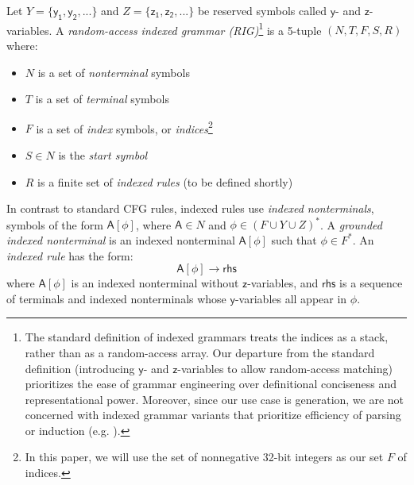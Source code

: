 \documentclass[11pt]{article}
\renewcommand{\bnfpn}[1]{\mathsf{#1}}
\renewcommand{\bnfpo}{\rightarrow}
\begin{document}
Let $Y = \{\bnfpn{y_1}, \bnfpn{y_2}, ...\}$ and $Z = \{\bnfpn{z_1}, \bnfpn{z_2}, ...\}$ be reserved symbols called $\bnfpn{y}$- and $\bnfpn{z}$-variables. A \emph{random-access indexed grammar (RIG)}\footnote{The standard definition of indexed grammars \cite{hopcroft2001introduction} treats the indices as a stack, rather than as a random-access array. Our departure from the standard definition (introducing $\bnfpn{y}$- and $\bnfpn{z}$-variables to allow random-access matching) prioritizes the ease of grammar engineering over definitional conciseness and representational power. Moreover, since our use case is generation, we are not concerned with indexed grammar variants that prioritize efficiency of parsing or induction (e.g. \cite{gazdar-1987-comit}).} is a 5-tuple $(N, T, F, S, R)$ where:
\begin{itemize}
	\item $N$ is a set of \emph{nonterminal} symbols
	\item $T$ is a set of \emph{terminal} symbols
	\item $F$ is a set of \emph{index} symbols, or \emph{indices}\footnote{In this paper, we will use the set of nonnegative 32-bit integers as our set $F$ of indices.}
	\item $S \in N$ is the \emph{start symbol}
	\item $R$ is a finite set of \emph{indexed rules} (to be defined shortly)
\end{itemize}
In contrast to standard CFG rules, indexed rules use \emph{indexed nonterminals}, symbols of the form $\bnfpn{A[\phi]}$, where $\bnfpn{A} \in N$ and $\bnfpn{\phi} \in (F \cup Y \cup Z)^*$. A \emph{grounded indexed nonterminal} is an indexed nonterminal $\bnfpn{A[\phi]}$ such that $\bnfpn{\phi} \in F^*$. An \emph{indexed rule} has the form:
\begin{equation*}
	\bnfpn{A[\phi]} \bnfpo \bnfpn{rhs}
\end{equation*}
where $\bnfpn{A[\phi]}$ is an indexed nonterminal without $\bnfpn{z}$-variables, and $\bnfpn{rhs}$ is a sequence of terminals and indexed nonterminals whose $\bnfpn{y}$-variables all appear in $\phi$.
\end{document}
